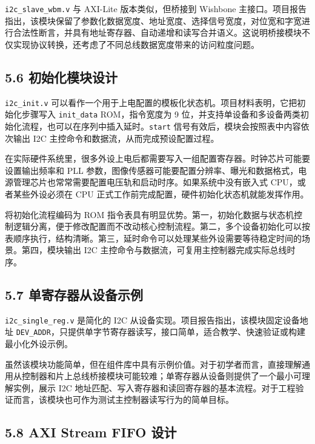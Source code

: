 \texttt{i2c\_slave\_wbm.v} 与 AXI-Lite 版本类似，但桥接到 Wishbone 主接口。项目报告指出，该模块保留了参数化数据宽度、地址宽度、选择信号宽度，对位宽和字宽进行合法性断言，并具有地址寄存器、自动递增和读写合并语义。这说明桥接模块不仅实现协议转换，还考虑了不同总线数据宽度带来的访问粒度问题。

\subsection{5.6 初始化模块设计}\label{ux521dux59cbux5316ux6a21ux5757ux8bbeux8ba1}

\texttt{i2c\_init.v} 可以看作一个用于上电配置的模板化状态机。项目材料表明，它把初始化步骤写入 \texttt{init\_data} ROM，指令宽度为 9 位，并支持单设备和多设备两类初始化流程，也可以在序列中插入延时。\texttt{start} 信号有效后，模块会按照表中内容依次输出 I2C 主控命令和数据流，从而完成预设配置过程。

在实际硬件系统里，很多外设上电后都需要写入一组配置寄存器。时钟芯片可能要设置输出频率和 PLL 参数，图像传感器可能要配置分辨率、曝光和数据格式，电源管理芯片也常常需要配置电压轨和启动时序。如果系统中没有嵌入式 CPU，或者某些外设必须在 CPU 正式工作前完成配置，硬件初始化状态机就能发挥作用。

将初始化流程编码为 ROM 指令表具有明显优势。第一，初始化数据与状态机控制逻辑分离，便于修改配置而不改动核心控制流程。第二，多个设备初始化可以按表顺序执行，结构清晰。第三，延时命令可以处理某些外设需要等待稳定时间的场景。第四，模块输出 I2C 主控命令与数据流，可复用主控制器完成实际总线时序。

\subsection{5.7 单寄存器从设备示例}\label{ux5355ux5bc4ux5b58ux5668ux4eceux8bbeux5907ux793aux4f8b}

\texttt{i2c\_single\_reg.v} 是简化的 I2C 从设备实现。项目报告指出，该模块固定设备地址 \texttt{DEV\_ADDR}，只提供单字节寄存器读写，接口简单，适合教学、快速验证或构建最小化外设示例。

虽然该模块功能简单，但在组件库中具有示例价值。对于初学者而言，直接理解通用从控制器和片上总线桥接模块可能较难；单寄存器从设备则提供了一个最小可理解实例，展示 I2C 地址匹配、写入寄存器和读回寄存器的基本流程。对于工程验证而言，该模块也可作为测试主控制器读写行为的简单目标。

\subsection{5.8 AXI Stream FIFO 设计}\label{axi-stream-fifo-ux8bbeux8ba1}

